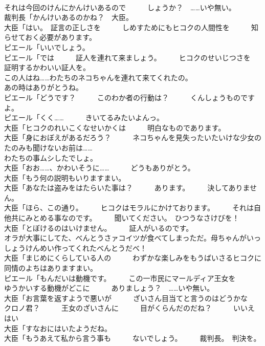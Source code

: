 \documentclass[8pt]{extreport}
\begin{document}
\begin{CJK}{UTF8}{min}
\\	それは今回のけんにかんけいあるので　　　しょうか？　……いや無い。	
\\	裁判長「かんけいあるのかね？　大臣。	
\\	大臣「はい。　証言の正しさを　　　しめすためにもヒコクの人間性を　　　知らせておく必要があります。	
\\	ピエール「いいでしょう。	
\\	ピエール「では　　　証人を連れて来ましょう。　　　ヒコクのせいじつさを　　　証明するかわいい証人を。	
\\	この人はね……わたちのネコちゃんを連れて来てくれたの。	
\\	あの時はありがとうね。	
\\	ピエール「どうです？　　　このわか者の行動は？　　　くんしょうものですよ。	
\\	ピエール「くく……　　　きいてるみたいよんっ。	
\\	大臣「ヒコクのれいこくなせいかくは　　　明白なものであります。	
\\	大臣「身におぼえがあるだろう？　　　ネコちゃんを見失ったいたいけな少女の　　　たのみも聞けないお前は……	
\\	わたちの事ムシしたでしょ。	
\\	大臣「おお……、かわいそうに……　　　どうもありがとう。	
\\	大臣「もう何の説明もいりますまい。	
\\	大臣「あなたは盗みをはたらいた事は？　　　あります。　　　決してありません。	
\\	大臣「ほら、この通り。　　　ヒコクはモラルにかけております。　　　それは自他共にみとめる事なのです。　　　聞いてください。　ひつうなさけびを！	
\\	大臣「とぼけるのはいけません。　　　証人がいるのです。	
\\	オラが大事にしてた、べんとうさァコイツが食べてしまっただ。母ちゃんがいっしょうけんめい作ってくれたべんとうだべ！	
\\	大臣「まじめにくらしている人の　　　わずかな楽しみをもうばいさるヒコクに　　　同情のよちはありますまい。	
\\	ピエール「もんだいは動機です。　　　この一市民にマールディア王女を　　　ゆうかいする動機がどこに　　　ありましょう？　……いや無い。	
\\	大臣「お言葉を返すようで悪いが　　　ざいさん目当てと言うのはどうかな　　　クロノ君？　　　王女のざいさんに　　　目がくらんだのだね？　　　いいえ　　　はい	
\\	大臣「すなおにはいたようだね。	
\\	大臣「もうあえて私から言う事も　　　ないでしょう。　　　裁判長。　判決を。	

\end{CJK}
\end{document}
